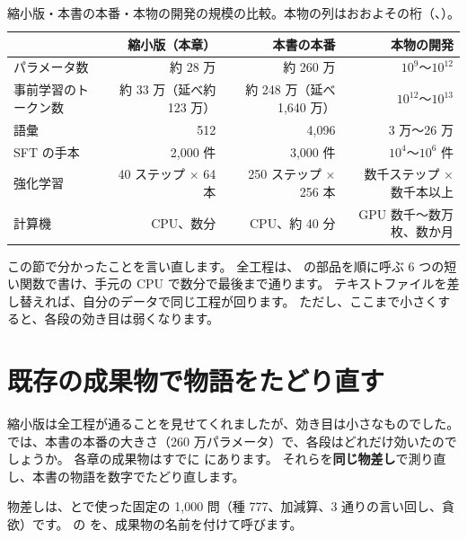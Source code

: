 \begin{table}[tbp]
\centering
\caption{縮小版・本書の本番・本物の開発の規模の比較。本物の列はおおよその桁（、）。}
\label{tab:cap-mini-vs}
\footnotesize\setlength{\tabcolsep}{4pt}
\begin{tabular}{@{}lrrr@{}}
\toprule
 & 縮小版（本章） & 本書の本番 & 本物の開発 \\
\midrule
パラメータ数 & 約 28 万 & 約 260 万 & $10^{9}$〜$10^{12}$ \\
事前学習のトークン数 & 約 33 万（延べ約 123 万） & 約 248 万（延べ 1,640 万） & $10^{12}$〜$10^{13}$ \\
語彙 & 512 & 4,096 & 3 万〜26 万 \\
SFT の手本 & 2,000 件 & 3,000 件 & $10^{4}$〜$10^{6}$ 件 \\
強化学習 & 40 ステップ × 64 本 & 250 ステップ × 256 本 & 数千ステップ × 数千本以上 \\
計算機 & CPU、数分 & CPU、約 40 分 & GPU 数千〜数万枚、数か月 \\
\bottomrule
\end{tabular}
\end{table}

この節で分かったことを言い直します。
全工程は、 の部品を順に呼ぶ 6 つの短い関数で書け、手元の CPU で数分で最後まで通ります。
テキストファイルを差し替えれば、自分のデータで同じ工程が回ります。
ただし、ここまで小さくすると、各段の効き目は弱くなります。

\section{既存の成果物で物語をたどり直す}\label{sec:cap-replay}

縮小版は全工程が通ることを見せてくれましたが、効き目は小さなものでした。
では、本書の本番の大きさ（260 万パラメータ）で、各段はどれだけ効いたのでしょうか。
各章の成果物はすでに  にあります。
それらを\textbf{同じ物差し}で測り直し、本書の物語を数字でたどり直します。

物差しは、とで使った固定の 1,000 問（種 777、加減算、3 通りの言い回し、貪欲）です。
 の  を、成果物の名前を付けて呼びます。

